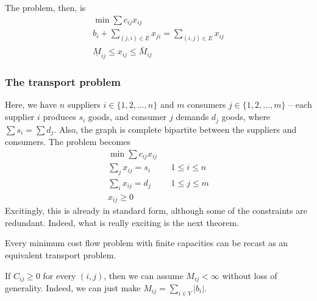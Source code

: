 \documentclass{../../template/note}
\begin{document}
    The problem, then, is
    \begin{align*}
        \min \sum c_{ij}x_{ij} \\
        b_i + \sum_{(j, i) \in E} x_{ji} = \sum_{(i, j) \in E} x_{ij} \\
        \underline M_{ij} \leq x_{ij} \leq \bar M_{ij}
    \end{align*}
    
    \subsubsection{The transport problem}

    Here, we have $n$ suppliers $i \in \{1, 2, \dots, n\}$ and $m$ consumers $j \in \{1, 2, \dots, m\}$ -- each supplier $i$ produces $s_i$ goods, and consumer $j$ demands $d_j$ goods, where $\sum s_i = \sum d_j$. Also, the graph is complete bipartite between the suppliers and consumers. The problem becomes
    \begin{align*}
        \min \sum c_{ij}x_{ij} \\
        \sum_j x_{ij} = s_i && 1 \leq i \leq n \\
        \sum_i x_{ij} = d_j && 1 \leq j \leq m \\
        x_{ij} \geq 0
    \end{align*}
    Excitingly, this is already in standard form, although some of the constraints are redundant. Indeed, what is really exciting is the next theorem.

    \begin{theorem}
        Every minimum cost flow problem with finite capacities can be recast as an equivalent transport problem.
    \end{theorem}
    
    \begin{remark*}
        If $C_{ij} \geq 0$ for every $(i, j)$, then we can assume $M_{ij} < \infty$ without loss of generality. Indeed, we can just make $M_{ij} = \sum_{i \in V} |b_i|$.
    \end{remark*}
    
\end{document}
